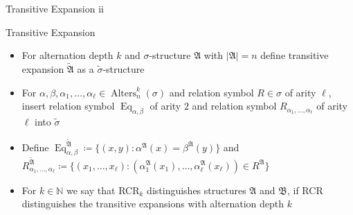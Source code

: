 \documentclass[aspectratio=169]{beamer}
\begin{document}
	\begin{frame}{Transitive Expansion ii}
		\begin{block}{Transitive Expansion}
			\begin{itemize}
				\item For alternation depth $k$ and $\sigma$-structure $\mathfrak A$ with $\vert \mathfrak A\vert = n$ define transitive expansion $\widetilde{\mathfrak A}$ as a $\widetilde{\sigma}$-structure
				\item For $\alpha,\beta,\alpha_1,\dots,\alpha_\ell\in \operatorname{Alters}^k_n(\sigma)$ and relation symbol $R\in\sigma$ of arity $\ell$, insert relation symbol $\operatorname{Eq}_{\alpha,\beta}$ of arity $2$ and relation symbol $R_{\alpha_1,\dots,\alpha_\ell}$ of arity $\ell$ into $\widetilde{\sigma}$
				\item Define $\operatorname{Eq}_{\alpha,\beta}^{\widetilde{\mathfrak A}}\coloneqq \{(x,y) : \alpha^{\mathfrak A}(x)=\beta^{\mathfrak A}(y)\}$ and $R_{\alpha_1,\dots,\alpha_\ell}^{\widetilde{\mathfrak A}}\coloneqq \{(x_1,\dots,x_\ell) : (\alpha_1^{\mathfrak A}(x_1),\dots,\alpha_\ell^{\mathfrak A}(x_\ell))\in R^{\mathfrak A}\}$
			\end{itemize}
		\end{block}
		\begin{itemize}
			\item For $k\in\mathbb N$ we say that RCR$_k$ distinguishes structures $\mathfrak A$ and $\mathfrak B$, if RCR distinguishes the transitive expansions with alternation depth $k$
		\end{itemize}
	\end{frame}
	
\end{document}
